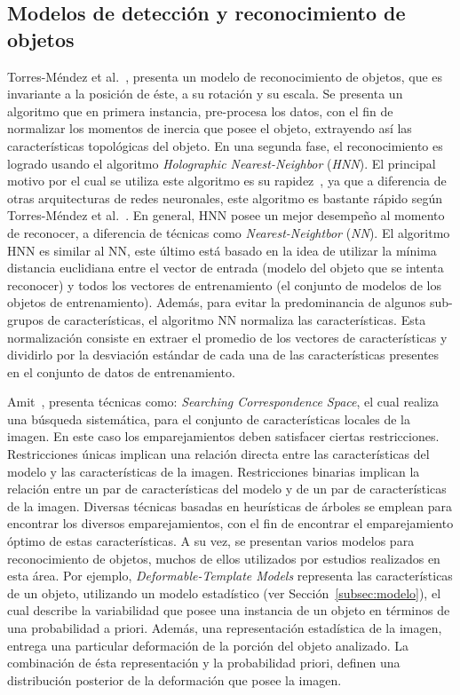 \subsection{Modelos de detección y reconocimiento de objetos}
Torres-Méndez et al.~\cite{trsi2000}, presenta un modelo de reconocimiento de objetos, que es invariante a la posición de éste, a su rotación y su escala. Se presenta un algoritmo que en primera instancia, pre-procesa los datos, con el fin de normalizar los momentos de inercia que posee el objeto, extrayendo así las características topológicas del objeto. En una segunda fase, el reconocimiento es logrado usando el algoritmo \textit{Holographic Nearest-Neighbor} (\textit{HNN}). El principal motivo por el cual se utiliza este algoritmo es su rapidez~\cite{trsi2000}, ya que a diferencia de otras arquitecturas de redes neuronales, este algoritmo es bastante rápido según Torres-Méndez et al.~\cite{trsi2000}. En general, HNN posee un mejor desempeño al momento de reconocer, a diferencia de técnicas como \textit{Nearest-Neightbor} (\textit{NN}). El algoritmo HNN es similar al NN, este último está basado en la idea de utilizar la mínima distancia euclidiana entre el vector de entrada (modelo del objeto que se intenta reconocer) y todos los vectores de entrenamiento (el conjunto de modelos de los objetos de entrenamiento). Además, para evitar la predominancia de algunos sub-grupos de características, el algoritmo NN normaliza las características. Esta normalización consiste en extraer el promedio de los vectores de características y dividirlo por la desviación estándar de cada una de las características presentes en el conjunto de datos de entrenamiento.

Amit~\cite{Amit2002}, presenta técnicas como: \textit{Searching Correspondence Space}, el cual realiza una búsqueda sistemática, para el conjunto de características locales de la imagen. En este caso los emparejamientos deben satisfacer ciertas restricciones. Restricciones únicas implican una relación directa entre las características del modelo y las características de la imagen. Restricciones binarias implican la relación entre un par de características del modelo y de un par de características de la imagen. Diversas técnicas basadas en heurísticas de árboles se emplean para encontrar los diversos emparejamientos, con el fin de encontrar el emparejamiento óptimo de estas características. A su vez, se presentan varios modelos para reconocimiento de objetos, muchos de ellos utilizados por estudios realizados en esta área. Por ejemplo, \textit{Deformable-Template Models} representa las características de un objeto, utilizando un modelo estadístico (ver Sección~\ref{subsec:modelo}), el cual describe la variabilidad que posee una instancia de un objeto en términos de una probabilidad a priori. Además, una representación  estadística de la imagen, entrega una particular deformación de la porción del objeto analizado. La combinación de ésta representación y la probabilidad priori, definen una distribución posterior de la deformación que posee la imagen.

